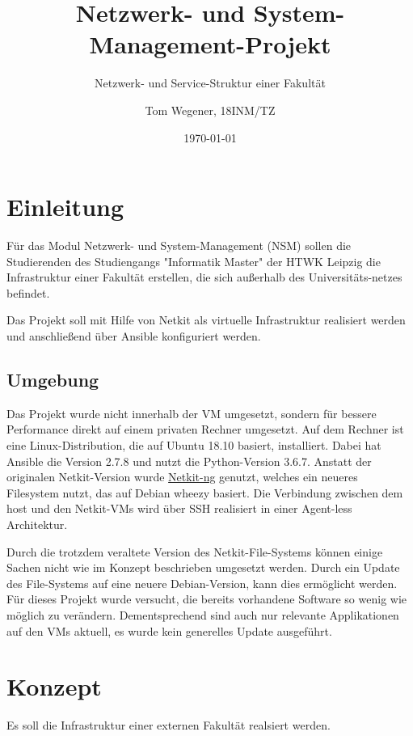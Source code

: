 \documentclass[a4paper]{article}
\title{Netzwerk- und System-Management-Projekt}
\subtitle{Netzwerk- und Service-Struktur einer Fakultät}
\date{\today}
\author{Tom Wegener, 18INM/TZ}
\begin{document}
\pagestyle{empty}

\maketitle

\newpage

\tableofcontents

\newpage

\pagestyle{fancy}

\setcounter{page}{1}

\section{Einleitung}
Für das Modul Netzwerk- und System-Management (NSM) sollen die Studierenden des Studiengangs "Informatik Master" der HTWK Leipzig die Infrastruktur einer Fakultät erstellen, die sich außerhalb des Universitäts-netzes befindet.

Das Projekt soll mit Hilfe von Netkit als virtuelle Infrastruktur realisiert werden und anschließend über Ansible konfiguriert werden.

\subsection{Umgebung}

Das Projekt wurde nicht innerhalb der VM umgesetzt, sondern für bessere Performance direkt auf einem privaten Rechner umgesetzt. Auf dem Rechner ist eine Linux-Distribution, die auf Ubuntu 18.10 basiert, installiert. Dabei hat Ansible die Version 2.7.8 und nutzt die Python-Version 3.6.7. Anstatt der originalen Netkit-Version wurde \href{https://netkit-ng.github.io/}{Netkit-ng} genutzt, welches ein neueres Filesystem nutzt, das auf Debian wheezy basiert.
Die Verbindung zwischen dem host und den Netkit-VMs wird über SSH realisiert in einer Agent-less Architektur.

Durch die trotzdem veraltete Version des Netkit-File-Systems können einige Sachen nicht wie im Konzept beschrieben umgesetzt werden. Durch ein Update des File-Systems auf eine neuere Debian-Version, kann dies ermöglicht werden. Für dieses Projekt wurde versucht, die bereits vorhandene Software so wenig wie möglich zu verändern. Dementsprechend sind auch nur relevante Applikationen auf den VMs aktuell, es wurde kein generelles Update ausgeführt.

\newpage

\section{Konzept}
Es soll die Infrastruktur einer externen Fakultät realsiert werden.
\end{document}
